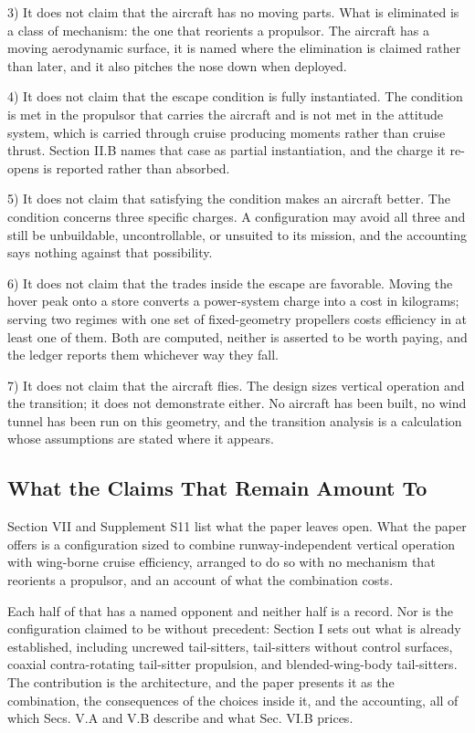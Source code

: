 \documentclass[journal]{new-aiaa}
\begin{document}
3) It does not claim that the aircraft has no moving parts. What is eliminated is a class of mechanism: the one that reorients a propulsor. The aircraft has a moving aerodynamic surface, it is named where the elimination is claimed rather than later, and it also pitches the nose down when deployed.

4) It does not claim that the escape condition is fully instantiated. The condition is met in the propulsor that carries the aircraft and is not met in the attitude system, which is carried through cruise producing moments rather than cruise thrust. Section II.B names that case as partial instantiation, and the charge it re-opens is reported rather than absorbed.

5) It does not claim that satisfying the condition makes an aircraft better. The condition concerns three specific charges. A configuration may avoid all three and still be unbuildable, uncontrollable, or unsuited to its mission, and the accounting says nothing against that possibility.

6) It does not claim that the trades inside the escape are favorable. Moving the hover peak onto a store converts a power-system charge into a cost in kilograms; serving two regimes with one set of fixed-geometry propellers costs efficiency in at least one of them. Both are computed, neither is asserted to be worth paying, and the ledger reports them whichever way they fall.

7) It does not claim that the aircraft flies. The design sizes vertical operation and the transition; it does not demonstrate either. No aircraft has been built, no wind tunnel has been run on this geometry, and the transition analysis is a calculation whose assumptions are stated where it appears.

\subsection{What the Claims That Remain Amount To}

Section VII and Supplement S11 list what the paper leaves open. What the paper offers is a configuration sized to combine runway-independent vertical operation with wing-borne cruise efficiency, arranged to do so with no mechanism that reorients a propulsor, and an account of what the combination costs.

Each half of that has a named opponent and neither half is a record. Nor is the configuration claimed to be without precedent: Section I sets out what is already established, including uncrewed tail-sitters, tail-sitters without control surfaces, coaxial contra-rotating tail-sitter propulsion, and blended-wing-body tail-sitters. The contribution is the architecture, and the paper presents it as the combination, the consequences of the choices inside it, and the accounting, all of which Secs. V.A and V.B describe and what Sec. VI.B prices.
\end{document}

